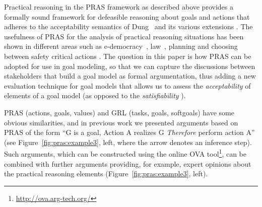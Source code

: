 Practical reasoning in the PRAS framework as described above provides a formally sound framework for defeasible reasoning about goals and actions that adheres to the acceptability semantics of Dung~\cite{Dung1995} and its various extensions \cite{amgoud2002reasoning,modgil2009}. The usefulness of PRAS for the analysis of practical reasoning situations has been shown in different areas such as e-democracy~\cite{cartwright2009IS}, law~\cite{atkinson2005legal}, planning \cite{medellin2013planning} and choosing between safety critical actions \cite{tolchinsky2012deliberation}. The question in this paper is how PRAS can be adopted for use in goal modeling, so that we can capture the discussions between stakeholders that build a goal model as formal argumentation, thus adding a new evaluation technique for goal models that allows us to assess the \emph{acceptability} of elements of a goal model (as opposed to the \emph{satisfiability} \cite{}).


PRAS (actions, goals, values) and GRL (tasks, goals, softgoals) have some obvious similarities, and in previous work \cite{vanzee-etal:renext2015,vanZee-etal:er2016,vanZee-etal:comma2016} we presented arguments based on PRAS of the form ``G is a goal, Action A realizes G \emph{Therefore} perform action A'' (see Figure~\ref{fig:pras:example3}, left, where the arrow denotes an inference step). Such arguments, which can be constructed using the online OVA tool\footnote{\url{http://ova.arg-tech.org/}}, can be combined with further arguments providing, for example, expert opinions about the practical reasoning elements (Figure~\ref{fig:pras:example3}, left).


